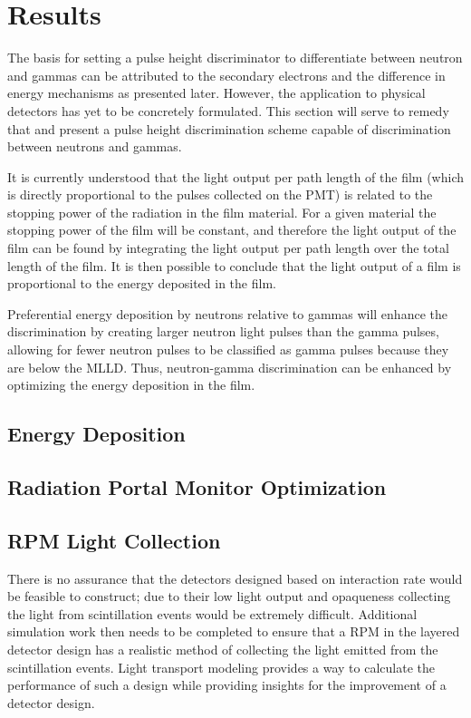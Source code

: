 \chapter{Results}
\label{chap:results}

The basis for setting a pulse height discriminator to differentiate between neutron and gammas can be attributed to the secondary electrons and the difference in energy mechanisms as presented later.
However, the application to physical detectors has yet to be concretely formulated.
This section will serve to remedy that and present a pulse height discrimination scheme capable of discrimination between neutrons and gammas.

It is currently understood that the light output per path length of the film (which is directly proportional to the pulses collected on the PMT) is related to the stopping power of the radiation in the film material.
For a given material the stopping power of the film will be constant, and therefore the light output of the film can be found by integrating the light output per path length over the total length of the film.
It is then possible to conclude that the light output of a film is proportional to the energy deposited in the film.

Preferential energy deposition by neutrons relative to gammas will enhance the discrimination by creating larger neutron light pulses than the gamma pulses, allowing for fewer neutron pulses to be classified as gamma pulses because they are below the MLLD.
Thus, neutron-gamma discrimination can be enhanced by optimizing the energy deposition in the film. 

\section{Energy Deposition}


\section{Radiation Portal Monitor Optimization}


\section{RPM Light Collection}
There is no assurance that the detectors designed based on interaction rate would be feasible to construct; due to their low light output and opaqueness collecting the light from scintillation events would be extremely difficult.  
Additional simulation work then needs to be completed to ensure that a RPM in the layered detector design has a realistic method of collecting the light emitted from the scintillation events.
Light transport modeling provides a way to calculate the performance of such a design while providing insights for the improvement of a detector design.

